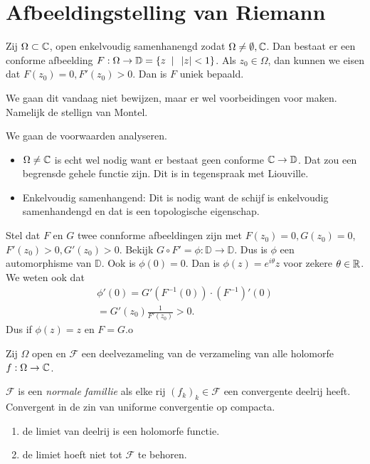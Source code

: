 
\section{Afbeeldingstelling van Riemann} \label{sec:afbeeldingstelling_van_riemann}
\begin{stelling}
Zij $\Omega \subset \mathbb{C}$, open enkelvoudig samenhanengd zodat $\Omega \ne \emptyset, \mathbb{C}$. Dan bestaat er een conforme afbeelding $F: \Omega \to \mathbb{D}= \{z \st \abs z < 1\} $. 
Als $z_0 \in \Omega$, dan kunnen we eisen dat $F(z_0) = 0, F'(z_0) > 0$. Dan is $F$ uniek bepaald.
\end{stelling}
We gaan dit vandaag niet bewijzen, maar er wel voorbeidingen voor maken. Namelijk de stellign van Montel. 

We gaan de voorwaarden analyseren. 
\begin{itemize}
	\item 
$\Omega \ne \mathbb{C}$ is echt wel nodig want er bestaat geen conforme $\mathbb{C} \to \mathbb{D}$. Dat zou een begrensde gehele functie zijn. Dit is in tegenspraak met Liouville.
\item Enkelvoudig samenhangend: Dit is nodig want de schijf is enkelvoudig samenhandengd en dat is een topologische eigenschap.
\end{itemize}

Stel dat $F$ en $G$ twee connforme afbeeldingen zijn met  $F(z_0) = 0 , G(z_0) = 0$, $F'(z_0) > 0, G'(z_0) > 0$. Bekijk $G \circ F' = \phi: \mathbb{D} \to \mathbb{D}$. 
Dus is $\phi$ een automorphisme van $\mathbb{D}$. Ook is $\phi(0) =  0$. Dan is $\phi(z) = e^{i\theta}z$ voor zekere  $\theta \in \mathbb{R}$.
We weten ook dat 
\begin{align*}
	\phi'(0) = G'(F^{-1}(0))\cdot (F^{-1})'(0) \\
	= G'(z_0) \frac{1}{F'(z_0)} > 0
.\end{align*}
Dus if $\phi(z) = z$ en $F = G$.o


Zij $\Omega$ open en $\mathcal{F} $ een deelvezameling van de verzameling van alle holomorfe $f: \Omega \to \mathbb{C}$. 
\begin{definitie}
	$\mathcal{F} $ is een \emph{normale famillie} als elke rij $(f_k)_k \in \mathcal{F} $ een convergente deelrij heeft. Convergent in de zin van uniforme convergentie op compacta.
\end{definitie}
\begin{opmerking}
	\begin{enumerate}
		\item de limiet van deelrij is een holomorfe functie.
		\item de limiet hoeft niet tot $\mathcal{F} $ te behoren. 
	\end{enumerate}
\end{opmerking}

